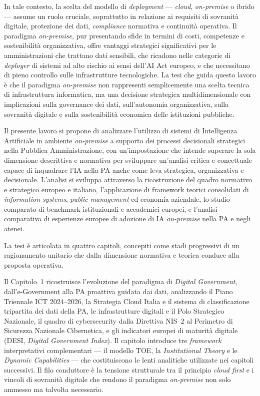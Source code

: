 In tale contesto, la scelta del modello di \textit{deployment} --- \textit{cloud}, \textit{on-premise} o ibrido --- assume un ruolo cruciale, soprattutto in relazione ai requisiti di sovranità digitale, protezione dei dati, \textit{compliance} normativa e continuità operativa. Il paradigma \textit{on-premise}, pur presentando sfide in termini di costi, competenze e sostenibilità organizzativa, offre vantaggi strategici significativi per le amministrazioni che trattano dati sensibili, che ricadono nelle categorie di \textit{deployer} di sistemi ad alto rischio ai sensi dell'AI Act europeo, e che necessitano di pieno controllo sulle infrastrutture tecnologiche. La tesi che guida questo lavoro è che il paradigma \textit{on-premise} non rappresenti semplicemente una scelta tecnica di infrastruttura informatica, ma una decisione strategica multidimensionale con implicazioni sulla governance dei dati, sull'autonomia organizzativa, sulla sovranità digitale e sulla sostenibilità economica delle istituzioni pubbliche.

Il presente lavoro si propone di analizzare l'utilizzo di sistemi di Intelligenza Artificiale in ambiente \textit{on-premise} a supporto dei processi decisionali strategici nella Pubblica Amministrazione, con un'impostazione che intende superare la sola dimensione descrittiva e normativa per sviluppare un'analisi critica e concettuale capace di inquadrare l'IA nella PA anche come leva strategica, organizzativa e decisionale. L'analisi si sviluppa attraverso la ricostruzione del quadro normativo e strategico europeo e italiano, l'applicazione di framework teorici consolidati di \textit{information systems}, \textit{public management} ed economia aziendale, lo studio comparato di benchmark istituzionali e accademici europei, e l'analisi comparativa di esperienze europee di adozione di IA \textit{on-premise} nella PA e negli atenei.

La tesi è articolata in quattro capitoli, concepiti come stadi progressivi di un ragionamento unitario che dalla dimensione normativa e teorica conduce alla proposta operativa.

Il Capitolo~1 ricostruisce l'evoluzione del paradigma di \textit{Digital Government}, dall'e-Government alla PA proattiva guidata dai dati, analizzando il Piano Triennale ICT 2024--2026, la Strategia Cloud Italia e il sistema di classificazione tripartita dei dati della PA, le infrastrutture digitali e il Polo Strategico Nazionale, il quadro di cybersecurity dalla Direttiva NIS~2 al Perimetro di Sicurezza Nazionale Cibernetica, e gli indicatori europei di maturità digitale (DESI, \textit{Digital Government Index}). Il capitolo introduce tre \textit{framework} interpretativi complementari --- il modello TOE, la \textit{Institutional Theory} e le \textit{Dynamic Capabilities} --- che costituiscono le lenti analitiche utilizzate nei capitoli successivi. Il filo conduttore è la tensione strutturale tra il principio \textit{cloud first} e i vincoli di sovranità digitale che rendono il paradigma \textit{on-premise} non solo ammesso ma talvolta necessario.

